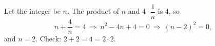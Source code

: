 Let the integer be $n$. The product of $n$ and $4\cdot\dfrac{1}{n}$ is $4$, so
\[
n+\dfrac{4}{n}=4\ \Longrightarrow\ n^2-4n+4=0\ \Longrightarrow\ (n-2)^2=0,
\]
and $n=\boxed{2}$. Check: $2+2=4=2\cdot2$.
